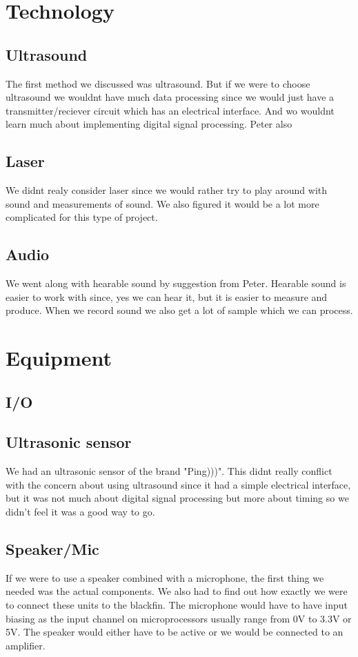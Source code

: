 \section{Technology}
\subsection{Ultrasound}
The first method we discussed was ultrasound. But if we were to choose ultrasound we wouldnt have much data processing since we would just have a transmitter/reciever circuit which has an electrical interface. And wo wouldnt learn much about implementing digital signal processing. Peter also 

\subsection{Laser}
We didnt realy consider laser since we would rather try to play around with sound and measurements of sound. We also figured it would be a lot more complicated for this type of project.

\subsection{Audio}
We went along with hearable sound by suggestion from Peter. Hearable sound is easier to work with since, yes we can hear it, but it is easier to measure and produce. When we record sound we also get a lot of sample which we can process.

\section{Equipment}
\subsection{I/O}
\subsection{Ultrasonic sensor}
We had an ultrasonic sensor of the brand "Ping)))". This didnt really conflict with the concern about using ultrasound since it had a simple electrical interface, but it was not much about digital signal processing but more about timing so we didn't feel it was a good way to go.
\subsection{Speaker/Mic}
If we were to use a speaker combined with a microphone, the first thing we needed was the actual components. We also had to find out how exactly we were to connect these units to the blackfin. The microphone would have to have input biasing as the input channel on microprocessors usually range from 0V to 3.3V or 5V. The speaker would either have to be active or we would be connected to an amplifier. 
